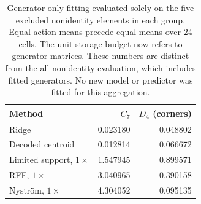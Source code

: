 \begin{table}[htbp]
\caption{Generator-only fitting evaluated solely on the five excluded nonidentity elements in each group. Equal action means precede equal means over 24 cells. The unit storage budget now refers to generator matrices. These numbers are distinct from the all-nonidentity evaluation, which includes fitted generators. No new model or predictor was fitted for this aggregation.}
\label{tab:reproduction-unseen}\centering\small
\begin{tabular}{lrr}\toprule
Method & $C_7$ & $D_4$ (corners) \\
\midrule
Ridge & 0.023180 & 0.048802 \\
Decoded centroid & 0.012814 & 0.066672 \\
Limited support, $1\times$ & 1.547945 & 0.899571 \\
RFF, $1\times$ & 3.040965 & 0.390158 \\
Nystr\"om, $1\times$ & 4.304052 & 0.095135 \\
\bottomrule\end{tabular}
\end{table}
